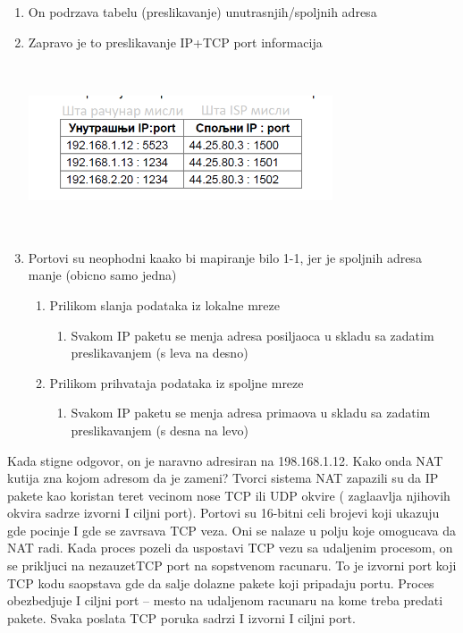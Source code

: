 \documentclass{article} %
\begin{document}
\begin{enumerate}
	\item On podrzava tabelu (preslikavanje) unutrasnjih/spoljnih adresa
	\item Zapravo je to preslikavanje IP+TCP port informacija 
	\begin{center}
		\includegraphics[width=9cm, height=5cm]{preslikavanje}\\
	\end{center}
	\item Portovi su neophodni kaako bi mapiranje bilo 1-1, jer je spoljnih adresa manje (obicno samo jedna)
	\begin{enumerate}
		\item Prilikom slanja podataka iz lokalne mreze 
			\begin{enumerate}
				\item Svakom IP paketu se menja adresa posiljaoca u skladu sa zadatim preslikavanjem (s leva na desno)
			\end{enumerate}
		\item Prilikom prihvataja podataka iz spoljne mreze
		\begin{enumerate}
			\item Svakom IP paketu se menja adresa primaova u skladu sa zadatim preslikavanjem (s desna na levo)
		\end{enumerate}
	\end{enumerate}
\end{enumerate}
Kada stigne odgovor, on je naravno adresiran na 198.168.1.12. Kako onda NAT kutija zna kojom adresom da je zameni? Tvorci sistema NAT zapazili su da IP pakete kao koristan teret  vecinom nose TCP ili UDP okvire ( zaglaavlja njihovih okvira sadrze izvorni I ciljni port). Portovi su 16-bitni celi brojevi koji ukazuju gde pocinje I gde se zavrsava TCP veza. Oni se nalaze u polju koje omogucava da NAT radi. Kada proces pozeli da uspostavi TCP vezu sa udaljenim procesom, on se prikljuci na nezauzetTCP port na sopstvenom racunaru. To je izvorni port koji TCP kodu saopstava gde da salje dolazne pakete koji pripadaju portu. Proces obezbedjuje I ciljni port – mesto na udaljenom racunaru na kome treba predati pakete. Svaka poslata TCP poruka sadrzi I izvorni I ciljni port.\\
\end{document}

